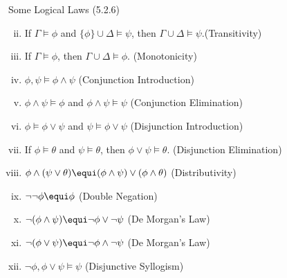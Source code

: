 \begin{frame}{Some Logical Laws (5.2.6)}

{\small

\begin{enumerate}[(i)]
			
				
				\setcounter{enumi}{1}
				
				\item If $\Gamma\vDash\phi$ and $\{\phi\}\cup\Delta\vDash\psi$, then $\Gamma\cup\Delta\vDash\psi$.\hfill (Transitivity)
			
				\item If $\Gamma\vDash\phi$, then $\Gamma\cup\Delta\vDash\phi$. \hfill(Monotonicity)
				
				\item $\phi,\psi\vDash\phi\land \psi$ \hfill(Conjunction Introduction)
				
				\item $\phi\land\psi\vDash\phi$ and $\phi\land\psi\vDash\psi$ \hfill (Conjunction Elimination)
				
				\item $\phi\vDash\phi\lor\psi$ and $\psi\vDash\phi\lor \psi$ \hfill (Disjunction Introduction)
				
				\item If $\phi\vDash\theta$ and $\psi\vDash\theta$, then $\phi\lor\psi\vDash\theta$. \hfill (Disjunction Elimination)
				
				\setcounter{enumi}{13}			
				\item $\phi\land(\psi\lor\theta)\equi (\phi\land\psi)\lor(\phi\land\theta)$ \hfill (Distributivity)
								\setcounter{enumi}{15}			

				
				\item $\neg\neg \phi\equi \phi$ \hfill (Double Negation)
				
				\item $\neg(\phi\land\psi)\equi \neg\phi\lor\neg\psi$ \hfill (De Morgan's Law)
				
				\item  $\neg(\phi\lor\psi)\equi \neg\phi\land\neg\psi$ \hfill (De Morgan's Law)
						
				\item $\neg\phi,\phi\lor \psi\vDash\psi$ \hfill (Disjunctive Syllogism)
				

\end{enumerate}}
\end{frame}
